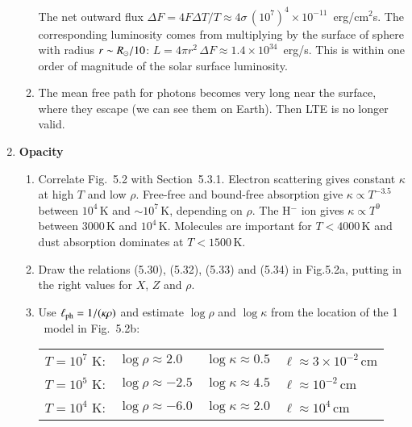 \documentclass[11pt,a4paper]{report}
\begin{document}
\begin{enumerate}
\begin{enumerate}
    The net outward flux $\Delta F = 4 F \Delta T/T \approx
    4\sigma\, (10^7)^4 \times 10^{-11}$~erg/cm$^2$s.  The
    corresponding luminosity comes from multiplying by the surface of
    sphere with radius $r\sim{R}_\odot/10$: $L = 4 \pi r^2\, \Delta F
    \approx 1.4 \times 10^{34}$~erg/s. This is within one order of
    magnitude of the solar surface luminosity.

    
  \item The mean free path for photons becomes very long near the
    surface, where they escape (we can see them on Earth). Then LTE is
    no longer valid.


  \end{enumerate}


\item {\bf Opacity}

  \begin{enumerate}

  \item Correlate Fig.~5.2 with Section~5.3.1. Electron scattering
    gives constant $\kappa$ at high $T$ and low $\rho$. Free-free and
    bound-free absorption give $\kappa \propto T^{-3.5}$ between
    $10^4$\,K and $\sim10^7$\,K, depending on $\rho$. The H$^{-}$ ion
    gives $\kappa \propto T^9$ between 3000\,K and $10^4$\,K. Molecules
    are important for $T<4000$\,K and dust absorption dominates at
    $T<1500$\,K.

  \item Draw the relations (5.30), (5.32), (5.33) and (5.34) in
    Fig.5.2a, putting in the right values for $X$, $Z$ and $\rho$.

  \item Use $\ell_{\rm ph} = 1/(\kappa\rho)$ and estimate $\log\rho$
    and $\log\kappa$ from the location of the 1\,\Msun\ model in
    Fig.~5.2b: \\[1ex]
    \begin{tabular}{llll}
    $T = 10^7$ K: & $\log\rho \approx 2.0$ & $\log\kappa \approx 0.5$
      & $\ell \approx 3\times 10^{-2}$\,cm \\
    $T = 10^5$ K: & $\log\rho \approx -2.5$ & $\log\kappa \approx 4.5$
      & $\ell \approx 10^{-2}$\,cm \\
    $T = 10^4$ K: & $\log\rho \approx -6.0$& $\log\kappa \approx 2.0$
      & $\ell \approx 10^4$\,cm \\
    \end{tabular}


\end{enumerate}
\end{enumerate}
\end{document}
